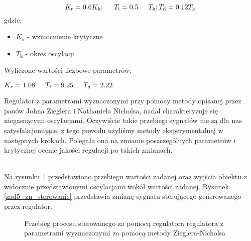 \begin{equation}
\label{zad5_zn_wzory}
K_{\mathrm{r}}=\num{0,6}K_{\mathrm{k}}; \hspace{0.5 cm} T_{\mathrm{i}}=\num{0,5} \hspace{0.5 cm} T_{\mathrm{k}}; T_{\mathrm{d}}=\num{0,12} T_{\mathrm{k}}
\end{equation}
gdzie:
\begin{center}
\begin{itemize}
    \item $K_{\mathrm{k}}$ - wzmocnienie krytyczne
    \item $T_{\mathrm{k}}$ - okres oscylacji
\end{itemize}
\end{center}

Wyliczone wartości liczbowe parametrów:
\begin{center}
$K_{r}=\num{1,08} \hspace{0.5 cm}
T_{i}=\num{9,25}   \hspace{0.5 cm}
T_{d}=\num{2,22}$
\end{center}

Regulator z parametrami wyznaczonymi przy pomocy metody opisanej przez panów Johna Zieglera i Nathaniela Nicholsa, nadal charakteryzuje się niegasnącymi oscylacjami. Oczywiście takie przebiegi sygnałów nie są dla nas satysfakcjonujące, z tego powodu użyliśmy metody eksperymentalnej w następnych krokach. Polegała ona na zmianie poszczególnych parametrów i krytycznej ocenie jakości regulacji po takich zmianach. 

~\\Na rysunku \ref{zad5_zn_regulator} przedstawiono przebiegu wartości zadanej oraz
wyjścia obiektu z widocznie przedstawionymi oscylacjami wokół wartości zadanej. Rysunek \ref{zad5_zn_sterowanie} przedstawia zmianę sygnału sterującego
generowanego przez regulator.
\begin{figure}[b]
    \centering
    \caption{Przebieg procesu sterowanego za pomocą regulatora regulatora z parametrami wyznaczonymi za pomocą metody Zieglera-Nicholsa}
    \label{zad5_zn_regulator}
\end{figure}

